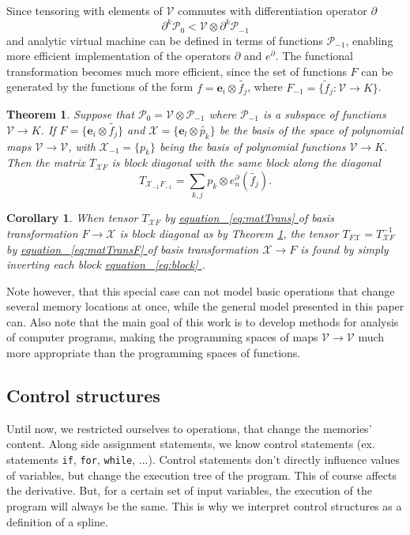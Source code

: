 \documentclass{article}
\makeatletter
\newcommand{\VV}{\mathcal{V}}
\newcommand{\e}{\mathbf{e}}
\newcommand{\X}{\mathcal{X}}
\newcommand{\dP}{\mathcal{P}}
\newcommand{\D}{\partial}
\newtheorem{izrek}{Theorem}[section]
\newtheorem{corollary}{Corollary}[section]
\let\originaleqref\eqref %
\renewcommand{\eqref}[1]{%
  \begingroup%
  \let\ref\@refstar%
  \hyperref[#1]{%
    equation%
    ~\originaleqref{#1}%
  }%
  \endgroup
}
\makeatother
\begin{document}
Since tensoring with elements of $\VV$ commutes with differentiation operator $\D$
\begin{equation}
  \label{eq:dP0_dP-1}
  \D^k\dP_0 < \VV\otimes \D^k\dP_{-1}
\end{equation}
and analytic virtual machine can be defined in terms of functions $\dP_{-1}$,
enabling more efficient implementation of the operators $\D$ and $e^\D$. The
functional transformation becomes much more efficient, since the set of
functions $F$ can be generated by the functions of the form  $f=\e_i\otimes
\tilde{f_j}$, where $F_{-1}=\{\tilde{f}_j:\VV\to K \}$.
\begin{izrek}\label{izr:blockDiagonal}
Suppose that $\dP_0=\VV\otimes \dP_{-1}$ where $\dP_{-1}$ is a subspace of functions $\VV\to K$. If $F=\{\e_i\otimes \tilde{f_j}\}$ and $\X=\{\e_l\otimes \tilde{p_k}\}$ be the basis of the space of polynomial maps $\VV\to\VV$, with $\X_{-1}=\{p_k\}$ being the basis
of polynomial functions $\VV\to K$. Then the matrix $T_{\X F}$ is block diagonal with the same block along the diagonal
\begin{equation}
  \label{eq:block}
  T_{\X_{-1}F_{-1}} = \sum\limits_{k,j} p_k\otimes e^{\D}_n(\tilde{f_j}).
\end{equation}
\end{izrek}
\begin{corollary}
When tensor $T_{\X F}$ by \eqref{eq:matTrans} of basis transformation $F\to\X$ is block diagonal as by Theorem \ref{izr:blockDiagonal}, the tensor $T_{F\X}=T_{\X F}^{-1}$ by \eqref{eq:matTransF} of basis transformation $\X\to F$ is found by simply inverting each block \eqref{eq:block}.
\end{corollary}
Note however, that this special case can not model basic operations that
change several memory locations at once, while the general model presented in this paper can. Also note that the main goal of this
work is to develop methods for analysis of computer programs, making the programming
spaces of maps $\VV\to \VV$ much more appropriate than the programming spaces of
functions.
 \subsection{Control structures}\label{sec:control}
 
 Until now, we restricted ourselves to operations, that change the memories' content. Along side assignment statements, we know control statements (ex. statements \texttt{if},
  \texttt{for}, \texttt{while}, ...). Control statements don't directly influence values of variables, but change the execution tree of the program. This of course affects the derivative. But, for a certain set of input variables, the execution of the program will always be the same. This is why we interpret control structures as a definition of a spline.
  
\end{document}
